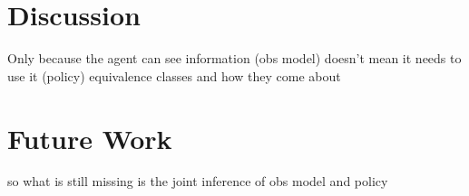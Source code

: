 \chapter{Discussion}
Only because the agent can see information (obs model) doesn't mean it needs to use it (policy)
equivalence classes and how they come about


\chapter{Future Work}

so what is still missing is the joint inference of obs model and policy